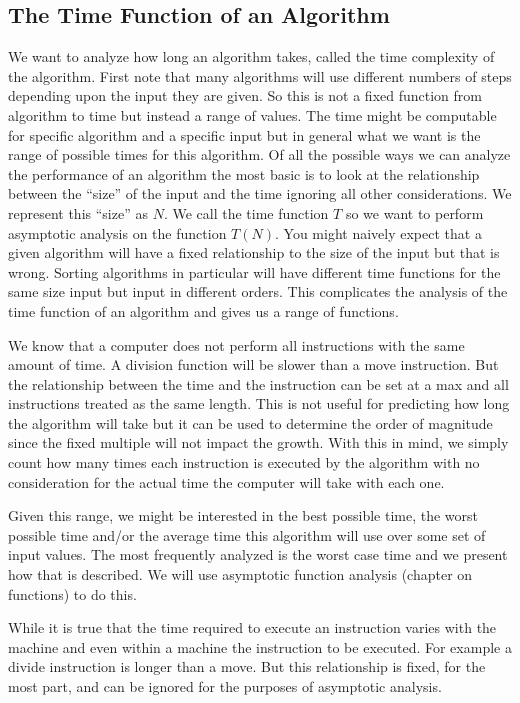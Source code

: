   \subsection{The Time Function of an Algorithm}
  We want to analyze how long an algorithm takes, called the time complexity of the algorithm. First note that many algorithms will use different numbers of steps depending upon the input they are given. So this is not a fixed function from algorithm to time but instead a range of values. The time might be computable for specific algorithm and a specific input but in general what we want is the range of possible times for this algorithm. Of all the possible ways we can analyze the performance of an algorithm the most basic is to look at the relationship between the ``size'' of the input and the time ignoring all other considerations. We represent this ``size'' as $N$. We call the time function $T$ so we want to perform asymptotic analysis on the function $T(N)$. You might naively expect that a given algorithm will have a fixed relationship to the size of the input but that is wrong. Sorting algorithms in particular will have different time functions for the same size input but input in different orders. This complicates the analysis of the time function of an algorithm and gives us a range of functions.
  
We know that a computer does not perform all instructions with the same amount of time. A division function will be slower than a move instruction. But the relationship between the time and the instruction can be set at a max and all instructions treated as the same length. This is not useful for predicting how long the algorithm will take but it can be used to determine the order of magnitude since the fixed multiple will not impact the growth. With this in mind, we simply count how many times each instruction is executed by the algorithm with no consideration for the actual time the computer will take with each one. 

Given this range, we might be interested in the best possible time, the worst possible time and/or the average time this algorithm will use over some set of input values. The most frequently analyzed is the worst case time and we present how that is described. We will use asymptotic function analysis (chapter on functions) to do this. 

While it is true that the time required to execute an instruction varies with the machine and even within a machine the instruction to be executed. For example a divide instruction is longer than a move. But this relationship is fixed, for the most part, and can be ignored for the purposes of asymptotic analysis. 

